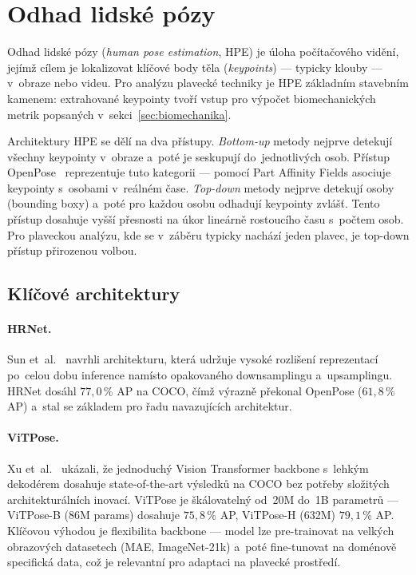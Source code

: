 \section{Odhad lidské pózy}
\label{sec:pose_estimation}

Odhad lidské pózy (\textit{human pose estimation}, HPE) je úloha počítačového vidění, jejímž cílem je lokalizovat klíčové body těla (\textit{keypoints}) --- typicky klouby --- v~obraze nebo videu. Pro analýzu plavecké techniky je HPE základním stavebním kamenem: extrahované keypointy tvoří vstup pro výpočet biomechanických metrik popsaných v~sekci~\ref{sec:biomechanika}.

Architektury HPE se dělí na dva přístupy. \textit{Bottom-up} metody nejprve detekují všechny keypointy v~obraze a~poté je seskupují do~jednotlivých osob. Přístup OpenPose~\cite{openpose2019} reprezentuje tuto kategorii --- pomocí Part Affinity Fields asociuje keypointy s~osobami v~reálném čase. \textit{Top-down} metody nejprve detekují osoby (bounding boxy) a~poté pro každou osobu odhadují keypointy zvlášť. Tento přístup dosahuje vyšší přesnosti na úkor lineárně rostoucího času s~počtem osob. Pro plaveckou analýzu, kde se v~záběru typicky nachází jeden plavec, je top-down přístup přirozenou volbou.

\subsection{Klíčové architektury}
\label{subsec:pe_architektury}

\paragraph{HRNet.}
Sun et~al.~\cite{hrnet2019} navrhli architekturu, která udržuje vysoké rozlišení reprezentací po~celou dobu inference namísto opakovaného downsamplingu a~upsamplingu. HRNet dosáhl $77{,}0$\,\% AP na COCO, čímž výrazně překonal OpenPose ($61{,}8$\,\% AP) a~stal se základem pro řadu navazujících architektur.

\paragraph{ViTPose.}
Xu et~al.~\cite{xu2022vitpose} ukázali, že jednoduchý Vision Transformer backbone s~lehkým dekodérem dosahuje state-of-the-art výsledků na COCO bez potřeby složitých architekturálních inovací. ViTPose je škálovatelný od~20M do~1B parametrů --- ViTPose-B (86M params) dosahuje $75{,}8$\,\% AP, ViTPose-H (632M) $79{,}1$\,\% AP. Klíčovou výhodou je flexibilita backbone --- model lze pre-trainovat na velkých obrazových datasetech (MAE, ImageNet-21k) a~poté fine-tunovat na doménově specifická data, což je relevantní pro adaptaci na plavecké prostředí.

